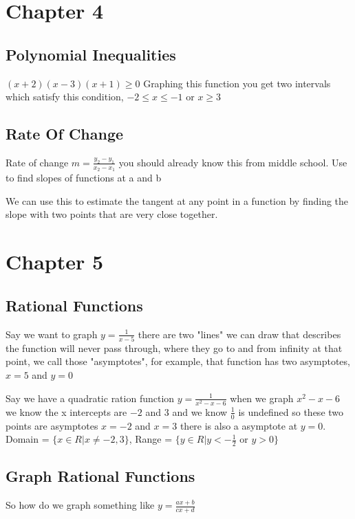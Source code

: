 \documentclass[../main.tex]{subfiles}
\begin{document}
\section{Chapter 4}
\subsection{Polynomial Inequalities}

$(x+2)(x-3)(x+1)\ge0$ Graphing this function you get two intervals which satisfy this condition, $-2\le x\le -1$ or $x\ge3$


\subsection{Rate Of Change}

Rate of change $m=\frac{y_2-y_1}{x_2-x_1}$ you should already know this from middle school. Use to find slopes of functions at a and b


We can use this to estimate the tangent at any point in a function by finding the slope with two points that are very close together.


\section{Chapter 5}
\subsection{Rational Functions}

Say we want to graph $y=\frac{1}{x-5}$ there are two "lines" we can draw that describes the function will never pass through, where they go to and from infinity at that point, we call those "asymptotes", for example, that function has two asymptotes, $x=5$ and $y=0$ 

Say we have a quadratic ration function $y=\frac{1}{x^2-x-6}$ when we graph $x^2-x-6$ we know the x intercepts are $-2$ and $3$ and we know $\frac{1}{0}$ is undefined so these two points are asymptotes $x=-2$ and $x=3$ there is also a asymptote at $y=0$. Domain = $\{x\in\!R|x\ne -2,3\}$, Range = $\{y\in\!R | y<-\frac{1}{2} \text{ or } y>0\}$

\subsection{Graph Rational Functions}

So how do we graph something like $y=\frac{ax+b}{cx+d}$
\end{document}
